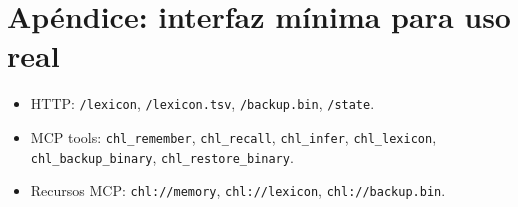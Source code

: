 \documentclass[11pt]{article}
\newcommand{\MCP}{\textsc{MCP}}
\begin{document}
\section*{Apéndice: interfaz mínima para uso real}

\begin{itemize}
  \item HTTP: \texttt{/lexicon}, \texttt{/lexicon.tsv}, \texttt{/backup.bin}, \texttt{/state}.
  \item \MCP{} tools: \texttt{chl\_remember}, \texttt{chl\_recall}, \texttt{chl\_infer}, \texttt{chl\_lexicon}, \texttt{chl\_backup\_binary}, \texttt{chl\_restore\_binary}.
  \item Recursos \MCP{}: \texttt{chl://memory}, \texttt{chl://lexicon}, \texttt{chl://backup.bin}.
\end{itemize}
\end{document}
